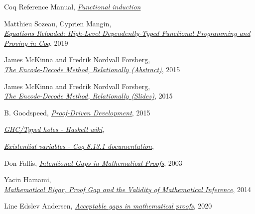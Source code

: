 \documentclass[declaration,mgr,english,shortabstract]{iithesis}
\begin{document}
\begin{thebibliography}{1}
    Coq Reference Manual,
    \href{https://coq.inria.fr/refman/using/libraries/funind.html}{\textit{Functional induction}}

    Matthieu Sozeau, Cyprien Mangin, \\
    \href{https://www.irif.fr/~sozeau//research/publications/Equations_Reloaded-ICFP19.pdf}{\textit{Equations Reloaded: High-Level Dependently-Typed Functional Programming and Proving in Coq}},
    2019

    James McKinna and Fredrik Nordvall Forsberg, \\
    \href{http://cs.ioc.ee/types15/abstracts-book/contrib27.pdf}{\textit{The Encode-Decode Method, Relationally (Abstract)}},
    2015

    James McKinna and Fredrik Nordvall Forsberg, \\
    \href{https://personal.cis.strath.ac.uk/fredrik.nordvall-forsberg/talks/stp_dundee_2015/stp_dundee_2015-10-07.pdf}{\textit{The Encode-Decode Method, Relationally (Slides)}},
    2015

    B. Goodspeed,
    \href{https://arxiv.org/pdf/1512.02102.pdf}{\textit{Proof-Driven Development}}, 2015

    \href{https://wiki.haskell.org/GHC/Typed_holes}{\textit{GHC/Typed holes - Haskell wiki}}, \\

    \href{https://coq.inria.fr/refman/language/extensions/evars.html}{\textit{Existential variables - Coq 8.13.1 documentation}}, \\

    Don Fallis,
    \href{https://www.jstor.org/stable/20117325?seq=1}{\textit{Intentional Gaps in Mathematical Proofs}}, 2003

    Yacin Hamami, \\
    \href{https://journals.openedition.org/philosophiascientiae/908}{\textit{Mathematical Rigor, Proof Gap and the Validity of Mathematical Inference}}, 2014

    Line Edslev Andersen,
    \href{https://link.springer.com/article/10.1007/s11229-018-1778-8}{\textit{Acceptable gaps in mathematical proofs}}, 2020


\end{thebibliography}
\end{document}

